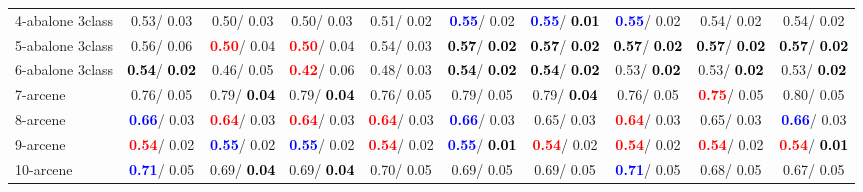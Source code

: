 \begin{table}[h]
\begin{center}
{\begin{tabular}{lc|c|c|c|c|c|c|c|c}
4-abalone 3class &   0.53/  0.03 &   0.50/  0.03 &   0.50/  0.03 &   0.51/  0.02 & \textcolor{blue}{\textbf{  0.55}}/  0.02 & \textcolor{blue}{\textbf{  0.55}}/\textcolor{black}{\textbf{  0.01}} & \textcolor{blue}{\textbf{  0.55}}/  0.02 &   0.54/  0.02 &   0.54/  0.02 \\
5-abalone 3class &   0.56/  0.06 & \textcolor{red}{\textbf{  0.50}}/  0.04 & \textcolor{red}{\textbf{  0.50}}/  0.04 &   0.54/  0.03 & \textcolor{black}{\textbf{  0.57}}/\textcolor{black}{\textbf{  0.02}} & \textcolor{black}{\textbf{  0.57}}/\textcolor{black}{\textbf{  0.02}} & \textcolor{black}{\textbf{  0.57}}/\textcolor{black}{\textbf{  0.02}} & \textcolor{black}{\textbf{  0.57}}/\textcolor{black}{\textbf{  0.02}} & \textcolor{black}{\textbf{  0.57}}/\textcolor{black}{\textbf{  0.02}} \\
6-abalone 3class & \textcolor{black}{\textbf{  0.54}}/\textcolor{black}{\textbf{  0.02}} &   0.46/  0.05 & \textcolor{red}{\textbf{  0.42}}/  0.06 &   0.48/  0.03 & \textcolor{black}{\textbf{  0.54}}/\textcolor{black}{\textbf{  0.02}} & \textcolor{black}{\textbf{  0.54}}/\textcolor{black}{\textbf{  0.02}} &   0.53/\textcolor{black}{\textbf{  0.02}} &   0.53/\textcolor{black}{\textbf{  0.02}} &   0.53/\textcolor{black}{\textbf{  0.02}} \\
7-arcene &   0.76/  0.05 &   0.79/\textcolor{black}{\textbf{  0.04}} &   0.79/\textcolor{black}{\textbf{  0.04}} &   0.76/  0.05 &   0.79/  0.05 &   0.79/\textcolor{black}{\textbf{  0.04}} &   0.76/  0.05 & \textcolor{red}{\textbf{  0.75}}/  0.05 &   0.80/  0.05 \\ \hline
8-arcene & \textcolor{blue}{\textbf{  0.66}}/  0.03 & \textcolor{red}{\textbf{  0.64}}/  0.03 & \textcolor{red}{\textbf{  0.64}}/  0.03 & \textcolor{red}{\textbf{  0.64}}/  0.03 & \textcolor{blue}{\textbf{  0.66}}/  0.03 &   0.65/  0.03 & \textcolor{red}{\textbf{  0.64}}/  0.03 &   0.65/  0.03 & \textcolor{blue}{\textbf{  0.66}}/  0.03 \\
9-arcene & \textcolor{red}{\textbf{  0.54}}/  0.02 & \textcolor{blue}{\textbf{  0.55}}/  0.02 & \textcolor{blue}{\textbf{  0.55}}/  0.02 & \textcolor{red}{\textbf{  0.54}}/  0.02 & \textcolor{blue}{\textbf{  0.55}}/\textcolor{black}{\textbf{  0.01}} & \textcolor{red}{\textbf{  0.54}}/  0.02 & \textcolor{red}{\textbf{  0.54}}/  0.02 & \textcolor{red}{\textbf{  0.54}}/  0.02 & \textcolor{red}{\textbf{  0.54}}/\textcolor{black}{\textbf{  0.01}} \\
10-arcene & \textcolor{blue}{\textbf{  0.71}}/  0.05 &   0.69/\textcolor{black}{\textbf{  0.04}} &   0.69/\textcolor{black}{\textbf{  0.04}} &   0.70/  0.05 &   0.69/  0.05 &   0.69/  0.05 & \textcolor{blue}{\textbf{  0.71}}/  0.05 &   0.68/  0.05 &   0.67/  0.05 \\

\end{tabular}}
\end{center}
\end{table}
